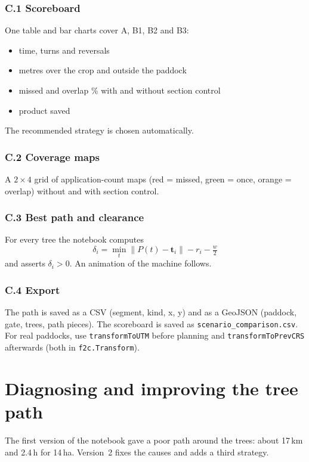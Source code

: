 \documentclass[11pt,a4paper]{article}
\newcommand{\code}[1]{\texttt{\small #1}}
\begin{document}
\subsubsection*{C.1 Scoreboard} One table and bar charts cover A, B1, B2 and B3:
\begin{itemize}[nosep]
  \item time, turns and reversals
  \item metres over the crop and outside the paddock
  \item missed and overlap \% with and without section control
  \item product saved
\end{itemize}
The recommended strategy is chosen automatically.

\subsubsection*{C.2 Coverage maps} A $2\times4$ grid of application-count maps (red = missed, green = once, orange = overlap) without and with section control.

\subsubsection*{C.3 Best path and clearance} For every tree the notebook computes
\begin{equation}
\delta_i=\min_t\lVert P(t)-\mathbf t_i\rVert-r_i-\tfrac{w}{2}
\end{equation}
and asserts $\delta_i>0$. An animation of the machine follows.

\subsubsection*{C.4 Export} The path is saved as a CSV (segment, kind, x, y) and as a GeoJSON (paddock, gate, trees, path pieces). The scoreboard is saved as \code{scenario\_comparison.csv}.
For real paddocks, use \code{transformToUTM} before planning and \code{transformToPrevCRS} afterwards (both in \code{f2c.Transform}).

\section{Diagnosing and improving the tree path}\label{sec:improve}

The first version of the notebook gave a poor path around the trees: about 17\,km and 2.4\,h for 14\,ha. Version~2 fixes the causes and adds a third strategy.
\end{document}
